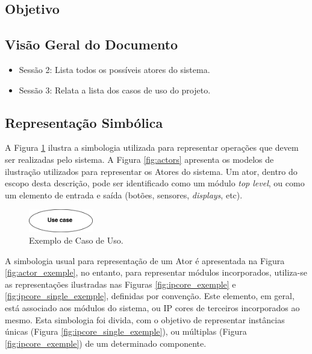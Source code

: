 \documentclass{article}
\begin{document}
  \subsection{Objetivo}
  
  \subsection{Visão Geral do Documento}
  \begin{itemize}
    \item Sessão 2: Lista todos os possíveis atores do sistema.
    \item Sessão 3: Relata a lista dos casos de uso do projeto.
  \end{itemize}
  
  \subsection{Representação Simbólica}
  A Figura \ref{fig:uc_exemple} ilustra a simbologia utilizada para representar operações que devem ser realizadas pelo sistema. A Figura \ref{fig:actors} apresenta os modelos de ilustração utilizados para representar os Atores do sistema. Um ator, dentro do escopo desta descrição, pode ser identificado como um módulo \textit{top level}, ou como um elemento de entrada e saída (botões, sensores, \textit{displays}, etc).
  
  \FloatBarrier
  \begin{figure}[H]
    \centering
    \includegraphics[width=0.25\textwidth]{uc_exemple.png}
    \caption{Exemplo de Caso de Uso.}
    \label{fig:uc_exemple}
  \end{figure}
  
  A simbologia usual para representação de um Ator é apresentada na Figura \ref{fig:actor_exemple}, no entanto, para representar módulos incorporados, utiliza-se as representações ilustradas nas Figuras \ref{fig:ipcore_exemple} e \ref{fig:ipcore_single_exemple}, definidas por convenção. Este elemento, em geral, está associado aos módulos do sistema, ou IP cores de terceiros incorporados ao mesmo. Esta simbologia foi divida, com o objetivo de representar instâncias únicas (Figura \ref{fig:ipcore_single_exemple}), ou múltiplas (Figura \ref{fig:ipcore_exemple}) de um determinado componente. 
  
\end{document}
